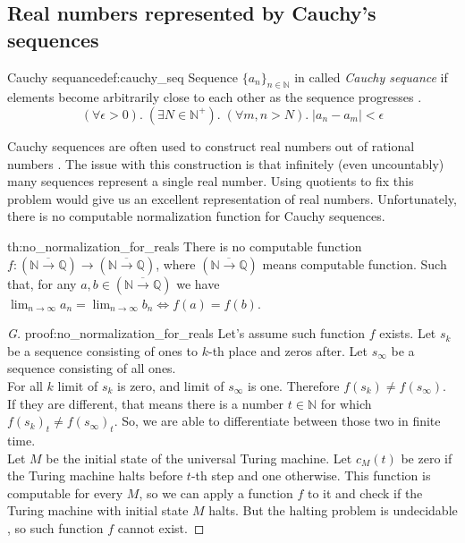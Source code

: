 \subsection{Real numbers represented by Cauchy’s sequences}
\begin{defi}{Cauchy sequance}{def:cauchy_seq}
Sequence $\{a_n\}_{n\in \mathbb{N}}$ in called \emph{Cauchy sequance} if elements become arbitrarily close to each other as the sequence progresses \cite{Anal}.
$$
    (\forall \epsilon > 0). \; (\exists N \in \mathbb{N}^+). \; (\forall m, n > N). \; |a_n - a_m| < \epsilon
$$
\end{defi}
Cauchy sequences are often used to construct real numbers out of rational numbers \cite{CauchyReals}. The issue with this construction is that infinitely (even uncountably) many sequences represent a single real number. Using quotients to fix this problem would give us an excellent representation of real numbers. Unfortunately, there is no computable normalization function for Cauchy sequences.

\begin{theo}{}{th:no_normalization_for_reals}
There is no computable function $f: (\overline{\mathbb{N} \rightarrow \mathbb{Q}}) \rightarrow (\overline{\mathbb{N} \rightarrow \mathbb{Q}})$, where $(\overline{\mathbb{N} \rightarrow \mathbb{Q}})$ means computable function. Such that, for any $a, b \in (\overline{\mathbb{N} \rightarrow \mathbb{Q}})$ we have $\lim_{n \rightarrow \infty}a_n = \lim_{n \rightarrow \infty}b_n \iff f(a) = f(b)$.
\end{theo}

\begin{proof}[G]{}{proof:no_normalization_for_reals}
Let's assume such function $f$ exists.
Let $s_k$ be a sequence consisting of ones to $k$-th place and zeros after. Let $s_\infty$ be a sequence consisting of all ones. \\For all $k$ limit of $s_k$ is zero, and limit of $s_\infty$ is one. Therefore $f(s_k)  \neq f(s_\infty)$. If they are different, that means there is a number $t \in \mathbb{N}$ for which $f(s_k)_t  \neq f(s_\infty)_t$. So, we are able to differentiate between those two in finite time.\\
Let $M$ be the initial state of the universal Turing machine. Let $c_M(t)$ be zero if the Turing machine halts before $t$-th step and one otherwise. This function is computable for every $M$, so we can apply a function $f$ to it and check if the Turing machine with initial state $M$ halts. But the halting problem is undecidable \cite{Undecidable}, so such function $f$ cannot exist. \contradiction
\end{proof}

